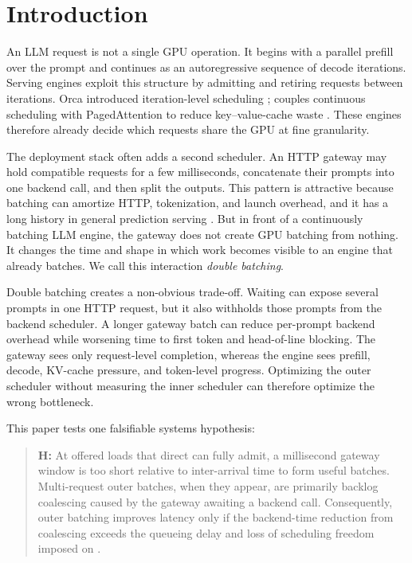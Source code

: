 \section{Introduction}
\label{sec:introduction}

An LLM request is not a single GPU operation. It begins with a parallel
prefill over the prompt and continues as an autoregressive sequence of decode
iterations. Serving engines exploit this structure by admitting and retiring
requests between iterations. Orca introduced iteration-level scheduling
\citep{yu2022orca}; \vllm{} couples continuous scheduling with PagedAttention
to reduce key--value-cache waste \citep{kwon2023pagedattention}. These engines
therefore already decide which requests share the GPU at fine granularity.

The deployment stack often adds a second scheduler. An HTTP gateway may hold
compatible requests for a few milliseconds, concatenate their prompts into one
backend call, and then split the outputs. This pattern is attractive because
batching can amortize HTTP, tokenization, and launch overhead, and it has a long
history in general prediction serving \citep{crankshaw2017clipper}. But in
front of a continuously batching LLM engine, the gateway does not create GPU
batching from nothing. It changes the time and shape in which work becomes
visible to an engine that already batches. We call this interaction
\emph{double batching}.

Double batching creates a non-obvious trade-off. Waiting can expose several
prompts in one HTTP request, but it also withholds those prompts from the
backend scheduler. A longer gateway batch can reduce per-prompt backend
overhead while worsening time to first token and head-of-line blocking. The
gateway sees only request-level completion, whereas the engine sees prefill,
decode, KV-cache pressure, and token-level progress. Optimizing the outer
scheduler without measuring the inner scheduler can therefore optimize the
wrong bottleneck.

This paper tests one falsifiable systems hypothesis:

\begin{quote}
\textbf{H:} At offered loads that direct \vllm{} can fully admit, a millisecond
gateway window is too short relative to inter-arrival time to form useful
batches. Multi-request outer batches, when they appear, are primarily backlog
coalescing caused by the gateway awaiting a backend call. Consequently, outer
batching improves latency only if the backend-time reduction from coalescing
exceeds the queueing delay and loss of scheduling freedom imposed on \vllm{}.
\end{quote}

